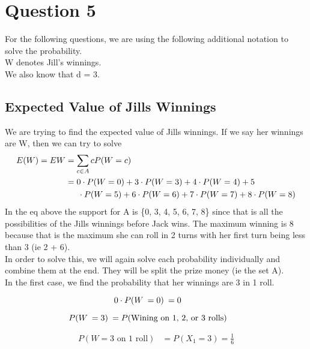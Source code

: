 \documentclass{article}
\numberwithin{equation}{section}
\newcommand{\eqname}[1]{\tag*{#1}}%
\begin{document}
\pagebreak
 
\section{Question 5}
For the following questions, we are using the following additional notation to solve the probability. 
\\ \indent W denotes Jill's winnings.
\\ \indent We also know that d = 3.
\subsection{Expected Value of Jills Winnings}
We are trying to find the expected value of Jills winnings. If we say her winnings are W, then we can try to solve
\begin{align} 
	    \label{Expected Jill Winnings}
		E(W) = EW &= \sum_{c\in A} cP(W=c) \eqname{} \\
		&= 0 \cdot P(W=0) + 3 \cdot P(W=3) + 4 \cdot P(W=4) + 5 \eqname{} \\
		& \indent \cdot P(W=5) + 6 \cdot P(W=6) + 7 \cdot P(W=7) + 8 \cdot P(W=8)
\end{align}
In the eq above the support for A is \{0, 3, 4, 5, 6, 7, 8\} since that is all the possibilities of the Jills winnings before Jack wins. The maximum winning is 8 because that is the maximum she can roll in 2 turns with her first turn being less than 3 (ie 2 + 6). \\

In order to solve this, we will again solve each probability individually and combine them at the end. They will be split the prize money (ie the set A). \\
In the first case, we find the probability that her winnings are 3 in 1 roll.

\begin{equation}
   0\cdot P(W\: = 0) \: = 0 \eqname{} \\
\end{equation}

\begin{equation}
    P(W\: = 3) \:= P(\text{Wining on 1, 2, or 3 rolls}) \eqname{} \\
\end{equation}

\begin{align}
	    \label{W=3 on 1 rollls}
        P(W = 3 \text{ on 1 roll}) &= P(X_1 = 3) = \frac{1}{6} \eqname{} \\
\end{align}
\end{document}
